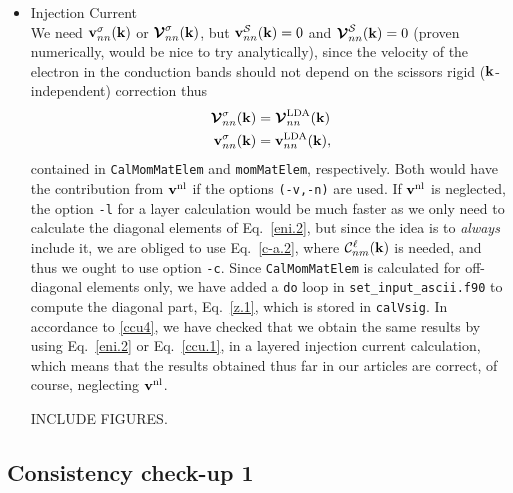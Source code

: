 \begin{itemize}
\item Injection Current\\
We need 
$\mathbf{v}^\sigma_{nn}(\mathbf{k})$
 or 
$\boldsymbol{\mathcal{\cal V}}^\sigma_{nn}(\mathbf{k})$, but $\mathbf{v}^{\cal S}_{nn}(\mathbf{k})=0$
and 
$\boldsymbol{\mathcal{\cal V}}^{\cal S}_{nn}(\mathbf{k})=0$ (proven numerically, would be nice to try
analytically), since the velocity of the electron in the conduction
bands should not depend on the scissors rigid ($\mathbf{k}$-independent) correction thus
\begin{align}\label{z.1}
\boldsymbol{\mathcal{\cal V}}^\sigma_{nn}(\mathbf{k})&=\boldsymbol{\mathcal{\cal V}}^{\mathrm{LDA}}_{nn}(\mathbf{k})
\nonumber\\ 
\mathbf{v}^\sigma_{nn}(\mathbf{k})&=\mathbf{v}^{\mathrm{LDA}}_{nn}(\mathbf{k}) 
,
\end{align}
contained in  \verb=CalMomMatElem= and  \verb=momMatElem=,
respectively. Both would have the contribution from $\mathbf{v}^{\mathrm{nl}}$ if the
options \verb=(-v,-n)= are used. If $\mathbf{v}^{\mathrm{nl}}$ is neglected, the
option \verb=-l= for a layer calculation would be much faster as we
only need to calculate the diagonal elements of Eq.~\eqref{eni.2}, but
since the idea is to {\it always} include it, we are obliged to use
Eq.~\eqref{c-a.2}, where ${\mathbf{\cal C}}^\ell_{nm}(\mathbf{k})$ is needed, and thus
we ought to use option \verb=-c=. 
Since  \verb=CalMomMatElem= is calculated for off-diagonal elements
only, we have added a \verb=do= loop in \verb=set_input_ascii.f90=
 to compute the diagonal  part, Eq.~\eqref{z.1}, which is
stored in \verb=calVsig=. In accordance to \ref{ccu4}, we have checked
that we obtain the same results by using Eq.~\eqref{eni.2} or
Eq.~\eqref{ccu.1}, in a layered injection current calculation, which
means that the results obtained thus far in our articles are correct,
of course, neglecting $\mathbf{v}^{\mathrm{nl}}$.

INCLUDE FIGURES.
\end{itemize}

\subsection{Consistency check-up 1}

